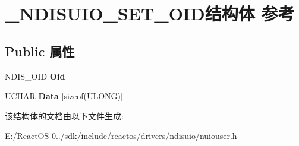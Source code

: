 \hypertarget{struct___n_d_i_s_u_i_o___s_e_t___o_i_d}{}\section{\+\_\+\+N\+D\+I\+S\+U\+I\+O\+\_\+\+S\+E\+T\+\_\+\+O\+I\+D结构体 参考}
\label{struct___n_d_i_s_u_i_o___s_e_t___o_i_d}
\subsection*{Public 属性}
\begin{DoxyCompactItemize}
\item 
\mbox{\label{struct___n_d_i_s_u_i_o___s_e_t___o_i_d_ab421f7f9b5620b3048cd6b2195d39197}} 
N\+D\+I\+S\+\_\+\+O\+ID {\bfseries Oid}
\item 
\mbox{\label{struct___n_d_i_s_u_i_o___s_e_t___o_i_d_af07a0e33d6d629864aeae827607f133d}} 
U\+C\+H\+AR {\bfseries Data} \mbox{[}sizeof(U\+L\+O\+NG)\mbox{]}
\end{DoxyCompactItemize}


该结构体的文档由以下文件生成\+:\begin{DoxyCompactItemize}
\item 
E\+:/\+React\+O\+S-\/0../sdk/include/reactos/drivers/ndisuio/nuiouser.\+h\end{DoxyCompactItemize}
